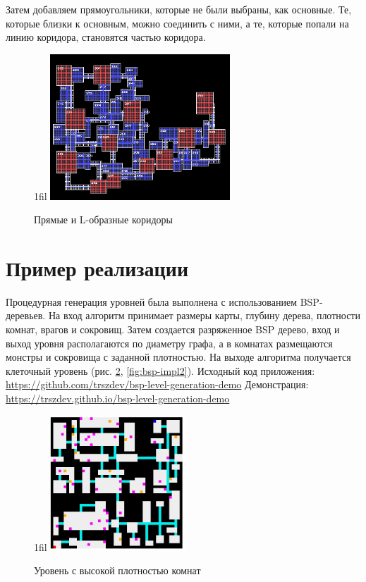 \documentclass[a4paper,12pt]{report}
\makeatletter
\theoremstyle{remark}
\newcommand*{\centerfloat}{%
  \parindent \z@
  \leftskip \z@ \@plus 1fil \@minus \textwidth
  \rightskip\leftskip
  \parfillskip \z@skip}
\makeatother
\begin{document}
Затем добавляем прямоугольники, которые не были выбраны, как основные. Те, которые близки к основным, можно соединить с ними, а те, которые попали на линию коридора, становятся частью коридора.

\begin{figure}
    \centerfloat
    \includegraphics[width=0.6\textwidth]{levels/room.png}
    \caption{Прямые и L-образные коридоры}
    \label{fig:room}
\end{figure}

\section{Пример реализации}

Процедурная генерация уровней была выполнена с использованием BSP-деревьев. На вход алгоритм принимает размеры карты, глубину дерева, плотности комнат, врагов и сокровищ. Затем создается разряженное BSP дерево, вход и выход уровня располагаются по диаметру графа, а в комнатах размещаются монстры и сокровища с заданной плотностью. На выходе алгоритма получается клеточный уровень (рис. \ref{fig:bsp-impl}, \ref{fig:bsp-impl2}).
\newline
\newline
Исходный код приложения: \url{https://github.com/trszdev/bsp-level-generation-demo}
\newline
Демонстрация: \url{https://trszdev.github.io/bsp-level-generation-demo}

\begin{figure}
    \centerfloat
    \includegraphics[width=0.45\textwidth]{levels/5.jpg}
    \caption{Уровень с высокой плотностью комнат}
    \label{fig:bsp-impl}
\end{figure}
\end{document}
